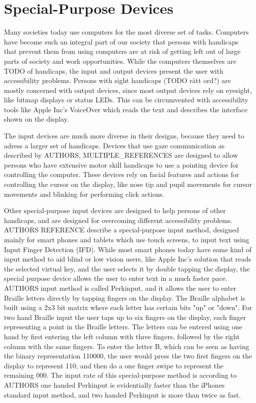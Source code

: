 \section{Special-Purpose Devices}

Many societies today use computers for the most diverse set of tasks. Computers have become such an integral part of our society that persons with handicaps that prevent them from using computers are at risk of getting left out of large parts of society and work opportunities. While the computers themselves are TODO of handicaps, the input and output devices present the user with accessibility problems. Persons with sight handicaps (TODO rätt ord?) are mostly concerned with output devices, since most output devices rely on eyesight, like bitmap displays or status LEDs. This can be circumvented with accessibility tools like Apple Inc's VoiceOver which reads the text and describes the interface shown on the display.

The input devices are much more diverse in their designs, because they need to adress a larger set of handicaps. Devices that use gaze communication as described by AUTHORS, MULTIPLE\_REFERENCES are designed to allow persons who have extensive motor skill handicaps to use a pointing device for controlling the computer. These devices rely on facial features and actions for controlling the cursor on the display, like nose tip and pupil movements for cursor movements and blinking for performing click actions.

Other special-purpose input devices are designed to help persons of other handicaps, and are designed for overcoming different accessibility problems. AUTHORS REFERENCE describe a special-purpose input method, designed mainly for smart phones and tablets which use touch screens, to input text using Input Finger Detection (IFD). While most smart phones today have some kind of input method to aid blind or low vision users, like Apple Inc's solution that reads the selected virtual key, and the user selects it by double tapping the display, the special purpose device allows the user to enter text in a much faster pace. AUTHORS input method is called Perkinput, and it allows the user to enter Braille letters directly by tapping fingers on the display. The Braille alphabet is built using a 2x3 bit matrix where each letter has certain bits "up" or "down". For two hand Braille input the user taps up to six fingers on the display, each finger representing a point in the Braille letters. The letters can be entered using one hand by first entering the left column with three fingers, followed by the right column with the same fingers. To enter the letter B, which can be seen as having the binary representation 110000, the user would press the two first fingers on the display to represent 110, and then do a one finger swipe to represent the remaining 000. The input rate of this special-purpose method is according to AUTHORS one handed Perkinput is evidentially faster than the iPhones standard input method, and two handed Perkinput is more than twice as fast.

